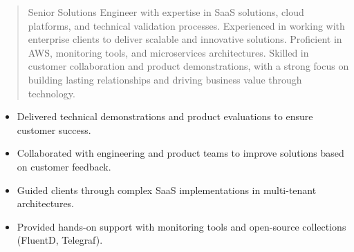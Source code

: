 



\makecvheader

\begin{quote}
  \noindent
  Senior Solutions Engineer with expertise in SaaS solutions, cloud platforms, and technical validation processes. Experienced in working with enterprise clients to deliver scalable and innovative solutions. Proficient in AWS, monitoring tools, and microservices architectures. Skilled in customer collaboration and product demonstrations, with a strong focus on building lasting relationships and driving business value through technology.
\end{quote}

\par\smallskip
\noindent
\begin{minipage}{20cm}
  \begin{minipage}{9.75cm}
    \begin{itemize}
      \item Delivered technical demonstrations and product evaluations to ensure customer success.
      \item Collaborated with engineering and product teams to improve solutions based on customer feedback.
    \end{itemize}
  \end{minipage}
  \hfill
  \begin{minipage}{9.75cm}
    \begin{itemize}
      \item Guided clients through complex SaaS implementations in multi-tenant architectures.
      \item Provided hands-on support with monitoring tools and open-source collections (FluentD, Telegraf).
    \end{itemize}
  \end{minipage}
\end{minipage}
\par\smallskip
\divider


